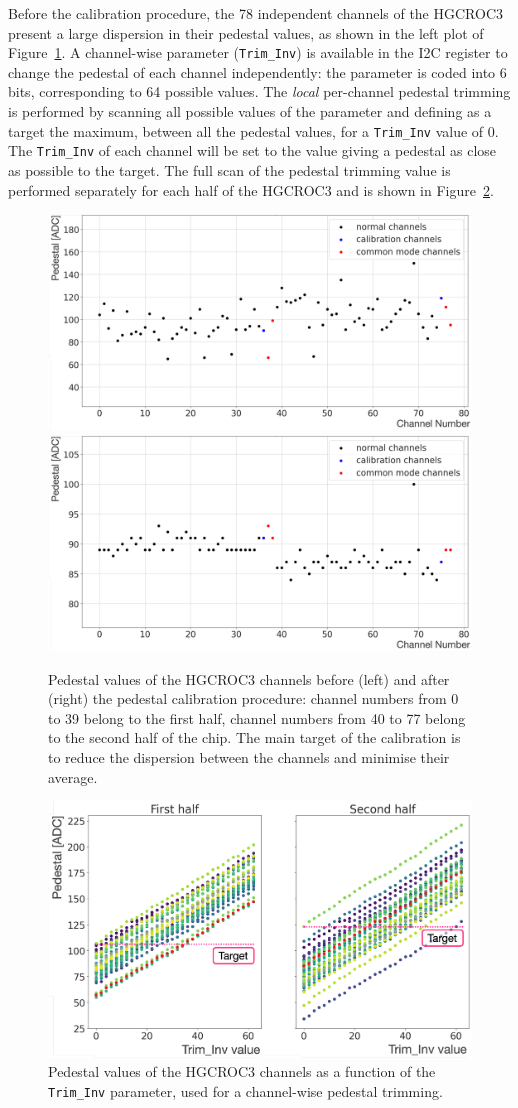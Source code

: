 Before the calibration procedure, the 78 independent channels of the HGCROC3 present a large dispersion in their pedestal values, as shown in the left plot of Figure~\ref{fig:Pedestal}. 
A channel-wise parameter (\texttt{Trim\_Inv}) is available in the I2C register to change the pedestal of each channel independently: the parameter is coded into 6 bits, corresponding to 64 possible values.
The \textit{local} per-channel pedestal trimming is performed by scanning all possible values of the parameter and defining as a target the maximum, between all the pedestal values, for a \texttt{Trim\_Inv} value of 0. The \texttt{Trim\_Inv} of each channel will be set to the value giving a pedestal as close as possible to the target.
The full scan of the pedestal trimming value is performed separately for each half of the HGCROC3 and is shown in Figure~\ref{fig:PedestalScan}.

\begin{figure}
    \centering
    \includegraphics[width=0.49\linewidth]{Figures/HGCAL/Pedestal_0.pdf}
    \includegraphics[width=0.49\linewidth]{Figures/HGCAL/Pedestal_1.pdf}
    \caption{Pedestal values of the HGCROC3 channels before (left) and after (right) the pedestal calibration procedure: channel numbers from 0 to 39 belong to the first half, channel numbers from 40 to 77 belong to the second half of the chip. The main target of the calibration is to reduce the dispersion between the channels and minimise their average.}
    \label{fig:Pedestal}
\end{figure}

\begin{figure} 
    \centering
    \includegraphics[width=0.7\linewidth]{Figures/HGCAL/PedestalScan.pdf}
    \caption{Pedestal values of the HGCROC3 channels as a function of the \texttt{Trim\_Inv} parameter, used for a channel-wise pedestal trimming.}
    \label{fig:PedestalScan}
\end{figure}


